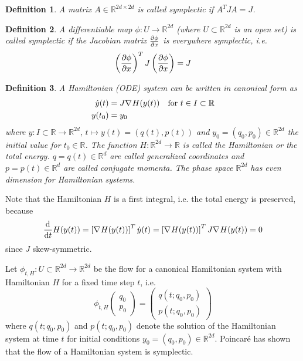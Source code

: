 \documentclass[twoside,a4paper]{article}
\newtheorem{definition}{Definition}
\begin{document}
\begin{definition}
	A matrix $A \in \mathbb{R}^{2d \times 2d}$ is called symplectic if $A^TJA=J$.
\end{definition}

\begin{definition}
	A differentiable map $\phi : U \to \mathbb{R}^{2d}$ (where $U \subset \mathbb{R}^{2d}$ is an open set)
	is called symplectic if the Jacobian matrix $\frac{\partial \phi}{\partial x}$ is everywhere symplectic, i.e.
	\begin{equation*}
		\left( \frac{\partial \phi}{\partial x} \right)^T J \left( \frac{\partial \phi}{\partial x} \right) = J
	\end{equation*}
\end{definition}

\begin{definition}
	A Hamiltonian (ODE) system can be written in canonical form as
	\begin{align*}
		\dot{y}(t) &= J \nabla_{}{H}(y(t)) \quad \text{for } t \in I \subset \mathbb{R} \\
		y(t_0) &= y_0
	\end{align*}
	where $y: I \subset \mathbb{R} \to \mathbb{R}^{2d},\, t \mapsto y(t) = (q(t),p(t))$ and 
	$y_0 = (q_0, p_0) \in \mathbb{R}^{2d}$ the initial value for $t_0 \in \mathbb{R}$. 
	The function $H: \mathbb{R}^{2d} \to \mathbb{R}$ is called the Hamiltonian 
	or the total energy. $q = q(t) \in \mathbb{R}^d$ are called generalized coordinates
	and $p=p(t) \in \mathbb{R}^d$ are called conjugate momenta. 
	The phase space $\mathbb{R}^{2d}$ has even dimension for Hamiltonian systems.
\end{definition}

Note that the Hamiltonian $H$ is a first integral, i.e. the total energy is preserved, because
\begin{equation*}
	\frac{\mathrm{d}^{}}{\mathrm{d}t} H(y(t)) = \left[ \nabla_{}{H}(y(t)) \right]^T \dot{y}(t) = 
	\left[ \nabla_{}{H}(y(t)) \right]^T J \nabla_{}{H}(y(t)) = 0
\end{equation*}
since $J$ skew-symmetric.

Let $\phi_{t,H} : U \subset \mathbb{R}^{2d} \to \mathbb{R}^{2d}$ be the flow for a 
canonical Hamiltonian system with Hamiltonian $H$ for a fixed time step $t$, i.e.
\begin{equation*}
	\phi_{t,H}\begin{pmatrix}
		q_0 \\
		p_0
	\end{pmatrix}
	= \begin{pmatrix}
		q(t; q_0, p_0) \\
		p(t; q_0, p_0)
	\end{pmatrix}
\end{equation*}
where $q(t; q_0, p_0)$ and $p(t; q_0, p_0)$ denote the solution of the Hamiltonian system
at time $t$ for initial conditions $y_0 = (q_0,p_0) \in \mathbb{R}^{2d}$. 
Poincaré has shown that the flow of a Hamiltonian system is symplectic.
\end{document}
